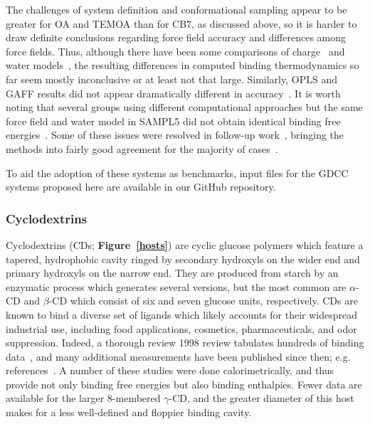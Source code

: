 \documentclass[aps,pre,twocolumn,nofootinbib,superscriptaddress,10pt, final,tightenlines]{revtex4-1}
\begin{document}
The challenges of system definition and conformational sampling appear to be greater for OA and TEMOA than for CB7, as discussed above, so it is harder to draw definite conclusions regarding force field accuracy and differences among force fields. 
Thus, although there have been some comparisons of charge~\cite{mikulskis_free-energy_2014, muddana_sampl4_2014, monroe_converging_2014} and water models~\cite{yin_sampl5_2016}, the resulting differences in computed binding thermodynamics so far seem mostly inconclusive or at least not that large. 
Similarly, OPLS and GAFF results did not appear dramatically different in accuracy~\cite{bhakat_resolving_2016}.
It is worth noting that several groups using different computational approaches but the same force field and water model in SAMPL5 did not obtain identical binding free energies~\cite{yin_overview_2016, bosisio_blinded_2016, bhakat_resolving_2016}. 
Some of these issues were resolved in follow-up work~\cite{bhakat_resolving_2016}, bringing the methods into fairly good agreement for the majority of cases~\cite{yin_sampl5_2016, bosisio_blinded_2016}.

To aid the adoption of these systems as benchmarks, input files for the GDCC systems proposed here are available in our GitHub repository. 

\subsubsection{Cyclodextrins}
\label{sec:cd}
Cyclodextrins (CDs; {\bf Figure~\ref{hosts}}) are cyclic glucose polymers which feature a tapered, hydrophobic cavity ringed by secondary hydroxyls on the wider end and primary hydroxyls on the narrow end. 
They are produced from starch by an enzymatic process which generates several versions, but the most common are $\alpha$-CD and $\beta$-CD which consist of six and seven glucose units, respectively.
CDs are known to bind a diverse set of ligands which likely accounts for their widespread industrial use, including food applications, cosmetics, pharmaceuticals, and odor suppression.
Indeed, a thorough review 1998 review tabulates hundreds of binding data~\cite{rekharsky_complexation_1998}, and many additional measurements have been published since then; e.g. references~\cite{Connors:1997:Chem.Rev., Carrazana:2005:J.Phys.Chem.B, Cotner:1998:J.Org.Chem., Wszelaka-Rylik:2013:JThermAnalCalorim,  Shu:2007:BritishJournalofPharmacology, Rodriguez-Perez:2006:J.Pharm.Sci., Mic:2013:AIPConferenceProceedings}.
A number of these studies were done calorimetrically, and thus provide not only binding free energies but also binding enthalpies. 
Fewer data are available for the larger 8-membered $\gamma$-CD, and the greater diameter of this host makes for a less well-defined and floppier binding cavity.
\end{document}
